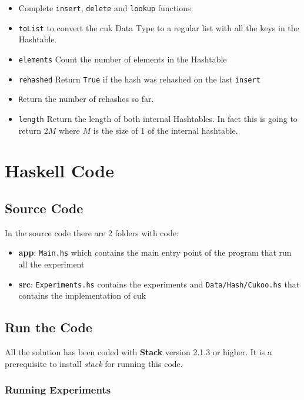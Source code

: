 \documentclass[12pt, a4paper]{article}
\begin{document}
\begin{itemize}
  \item Complete \texttt{insert}, \texttt{delete} and \texttt{lookup} functions
  \item \texttt{toList} to convert the \acrshort{cuk} Data Type to a regular list with all the keys in the Hashtable.
  \item \texttt{elements} Count the number of elements in the Hashtable
  \item \texttt{rehashed} Return \texttt{True} if the hash was rehashed on the last \texttt{insert}
  \item \texttt Return the number of rehashes so far.
  \item \texttt{length} Return the length of both internal Hashtables. In fact this is going to return $2M$ where $M$ is the size of 1 of the internal hashtable.
\end{itemize}


\appendix\label{appendix}
\section{Haskell Code}
\subsection{Source Code}
In the source code there are 2 folders with code:

\begin{itemize}
  \item \textbf{app}: \texttt{Main.hs} which contains the main entry point of the program that run all the experiment
  \item \textbf{src}: \texttt{Experiments.hs} contains the experiments and \texttt{Data/Hash/Cukoo.hs} that contains the implementation of \acrshort{cuk}
\end{itemize}

\subsection{Run the Code}
All the solution has been coded with \textbf{Stack} \cite{stack} version 2.1.3 or higher. It is a prerequisite to install \textit{stack} for running this code.

\subsubsection{Running Experiments}
\end{document}
